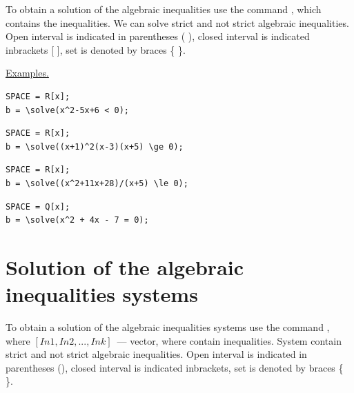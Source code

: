 To obtain a solution of the algebraic inequalities use the command  , which contains the inequalities.
We can solve strict and not strict algebraic inequalities. Open interval is indicated in parentheses ( ), closed interval is indicated inbrackets [ ], set is denoted by braces \{ \}.

\underline{Examples. }

\begin{verbatim}
SPACE = R[x];
b = \solve(x^2-5x+6 < 0);
\end{verbatim}


\begin{verbatim}
SPACE = R[x];
b = \solve((x+1)^2(x-3)(x+5) \ge 0);
\end{verbatim}

\ex{$SPACE=R[x]; $\\
\hspace*{4mm} $b=solve((x+1)^2(x-3)(x+5) \ge 0);$}{$(-\infty,-5] \cup\{-1\}\cup[3,\infty)$.}

\begin{verbatim}
SPACE = R[x];
b = \solve((x^2+11x+28)/(x+5) \le 0);
\end{verbatim}

\ex{$SPACE=R[x]; $\\
\hspace*{4mm} $b=solve((x^2+11x+28)/(x+5) \le 0);$}{$(-\infty,-7]\cup(-5,-4]$.}

\begin{verbatim}
SPACE = Q[x];
b = \solve(x^2 + 4x - 7 = 0);
\end{verbatim}

\section{Solution of the algebraic inequalities systems}

To obtain a solution of the algebraic inequalities systems use the command , where $[In1, In2, ..., Ink]$~--- vector, where contain inequalities.
System contain strict and not strict algebraic inequalities. Open interval is indicated in parentheses (), closed interval is indicated inbrackets, set is denoted by braces \{ \}.


